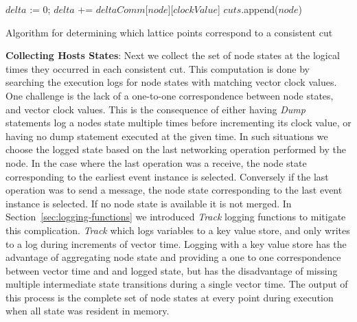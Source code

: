 
\begin{algorithm}
  {
     {
        $delta$ := $0$;
         {
             {
                $delta$ += $deltaComm$[$node$][$clockValue$]
            }
       }
        {
            $cuts$.append($node$)
       }
    }
 }

    \vspace{2mm}
 \caption{Algorithm for determining which lattice points correspond to a consistent cut}
 \label{alg:mineCuts}
\end{algorithm}



\textbf{Collecting Hosts States}: Next we collect the set of node
states  at the logical times they occurred in each consistent cut.
This computation is done by searching the execution logs for node
states with matching vector clock values.
%
One challenge is the lack of a one-to-one correspondence between node
states, and vector clock values.  This is the consequence of either
having \textit{Dump} statements log a nodes state multiple times
before incrementing its clock value, or having no dump statement
executed at the given time. In such situations we choose the logged
state based on the last networking operation performed by the node. In
the case where the last operation was a receive, the node state
corresponding to the earliest event instance is selected. Conversely
if the last operation was to send a message, the node state
corresponding to the last event instance is selected.  If no node
state is available it is not merged. In
Section~\ref{sec:logging-functions} we introduced \textit{Track}
logging functions to mitigate this complication.  \textit{Track} which
logs variables to a key value store, and only writes to a log during
increments of vector time.  Logging with a key value store has the
advantage of aggregating node state and providing a one to one
correspondence between vector time and and logged state, but has the
disadvantage of missing multiple intermediate state transitions during
a single vector time.  The output of this process is the complete set
of node states at every point during execution when all state was
resident in memory. 


